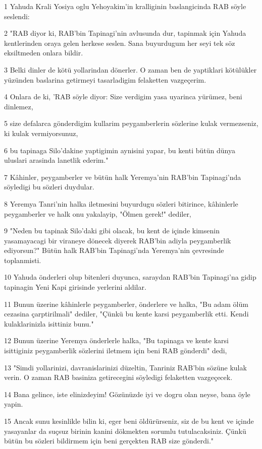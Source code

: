 \par 1 Yahuda Krali Yosiya oglu Yehoyakim'in kralliginin baslangicinda RAB söyle seslendi:
\par 2 "RAB diyor ki, RAB'bin Tapinagi'nin avlusunda dur, tapinmak için Yahuda kentlerinden oraya gelen herkese seslen. Sana buyurdugum her seyi tek söz eksiltmeden onlara bildir.
\par 3 Belki dinler de kötü yollarindan dönerler. O zaman ben de yaptiklari kötülükler yüzünden baslarina getirmeyi tasarladigim felaketten vazgeçerim.
\par 4 Onlara de ki, 'RAB söyle diyor: Size verdigim yasa uyarinca yürümez, beni dinlemez,
\par 5 size defalarca gönderdigim kullarim peygamberlerin sözlerine kulak vermezseniz, ki kulak vermiyorsunuz,
\par 6 bu tapinaga Silo'dakine yaptigimin aynisini yapar, bu kenti bütün dünya uluslari arasinda lanetlik ederim."
\par 7 Kâhinler, peygamberler ve bütün halk Yeremya'nin RAB'bin Tapinagi'nda söyledigi bu sözleri duydular.
\par 8 Yeremya Tanri'nin halka iletmesini buyurdugu sözleri bitirince, kâhinlerle peygamberler ve halk onu yakalayip, "Ölmen gerek!" dediler,
\par 9 "Neden bu tapinak Silo'daki gibi olacak, bu kent de içinde kimsenin yasamayacagi bir viraneye dönecek diyerek RAB'bin adiyla peygamberlik ediyorsun?" Bütün halk RAB'bin Tapinagi'nda Yeremya'nin çevresinde toplanmisti.
\par 10 Yahuda önderleri olup bitenleri duyunca, saraydan RAB'bin Tapinagi'na gidip tapinagin Yeni Kapi girisinde yerlerini aldilar.
\par 11 Bunun üzerine kâhinlerle peygamberler, önderlere ve halka, "Bu adam ölüm cezasina çarptirilmali" dediler, "Çünkü bu kente karsi peygamberlik etti. Kendi kulaklarinizla isittiniz bunu."
\par 12 Bunun üzerine Yeremya önderlerle halka, "Bu tapinaga ve kente karsi isittiginiz peygamberlik sözlerini iletmem için beni RAB gönderdi" dedi,
\par 13 "Simdi yollarinizi, davranislarinizi düzeltin, Tanriniz RAB'bin sözüne kulak verin. O zaman RAB basiniza getirecegini söyledigi felaketten vazgeçecek.
\par 14 Bana gelince, iste elinizdeyim! Gözünüzde iyi ve dogru olan neyse, bana öyle yapin.
\par 15 Ancak sunu kesinlikle bilin ki, eger beni öldürürseniz, siz de bu kent ve içinde yasayanlar da suçsuz birinin kanini dökmekten sorumlu tutulacaksiniz. Çünkü bütün bu sözleri bildirmem için beni gerçekten RAB size gönderdi."
